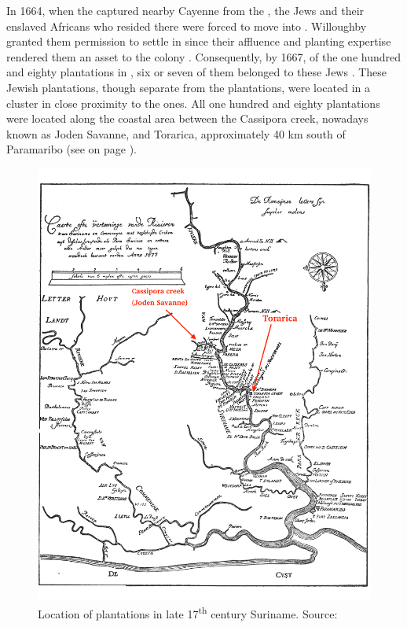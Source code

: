 In 1664, when the  captured nearby Cayenne from the , the  Jews and their enslaved Africans who resided there were forced to move into  \citep{Redfield00, Friedman99}. Willoughby granted them permission to settle in  since their affluence and planting expertise rendered them an asset to the colony \citep{Ehrlich09}. Consequently, by 1667, of the one hundred and eighty plantations in , six or seven of them belonged to these  Jews \citep{Arbell02, Rens53}. These Jewish plantations, though separate from the  plantations, were located in a cluster in close proximity to the  ones. All one hundred and eighty plantations were located along the coastal area between the Cassipora creek, nowadays known as Joden Savanne, and Torarica, approximately 40 km south of Paramaribo (see  on page \pageref{Map1.1}).

\begin{figure}
\includegraphics[width=\textwidth] {figures/1677kaartSurinameMogge.pdf}
\caption {Location of plantations in late 17\textsuperscript{th} century Suriname. Source: \citet{Mogge77}} 
\label{Map1.1}
\end{figure}


